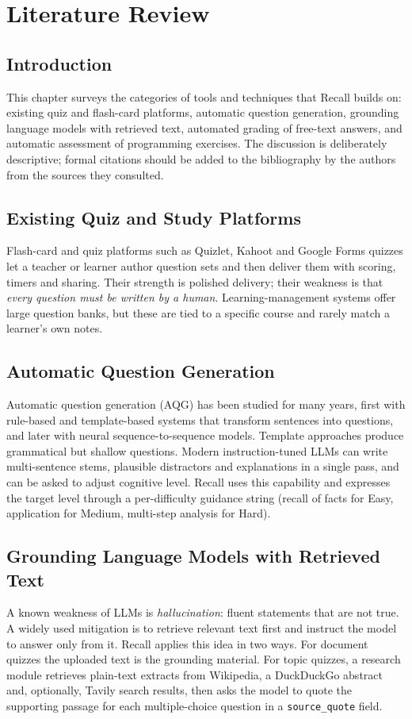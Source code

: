 \chapter{Literature Review}

\section{Introduction}
This chapter surveys the categories of tools and techniques that Recall builds on: existing quiz and flash-card platforms, automatic question generation, grounding language models with retrieved text, automated grading of free-text answers, and automatic assessment of programming exercises. The discussion is deliberately descriptive; formal citations should be added to the bibliography by the authors from the sources they consulted.

\section{Existing Quiz and Study Platforms}
Flash-card and quiz platforms such as Quizlet, Kahoot and Google Forms quizzes let a teacher or learner author question sets and then deliver them with scoring, timers and sharing. Their strength is polished delivery; their weakness is that \textit{every question must be written by a human}. Learning-management systems offer large question banks, but these are tied to a specific course and rarely match a learner's own notes.

\section{Automatic Question Generation}
Automatic question generation (AQG) has been studied for many years, first with rule-based and template-based systems that transform sentences into questions, and later with neural sequence-to-sequence models. Template approaches produce grammatical but shallow questions. Modern instruction-tuned LLMs can write multi-sentence stems, plausible distractors and explanations in a single pass, and can be asked to adjust cognitive level. Recall uses this capability and expresses the target level through a per-difficulty guidance string (recall of facts for Easy, application for Medium, multi-step analysis for Hard).

\section{Grounding Language Models with Retrieved Text}
A known weakness of LLMs is \textit{hallucination}: fluent statements that are not true. A widely used mitigation is to retrieve relevant text first and instruct the model to answer only from it. Recall applies this idea in two ways. For document quizzes the uploaded text is the grounding material. For topic quizzes, a research module retrieves plain-text extracts from Wikipedia, a DuckDuckGo abstract and, optionally, Tavily search results, then asks the model to quote the supporting passage for each multiple-choice question in a \texttt{source\_quote} field.

